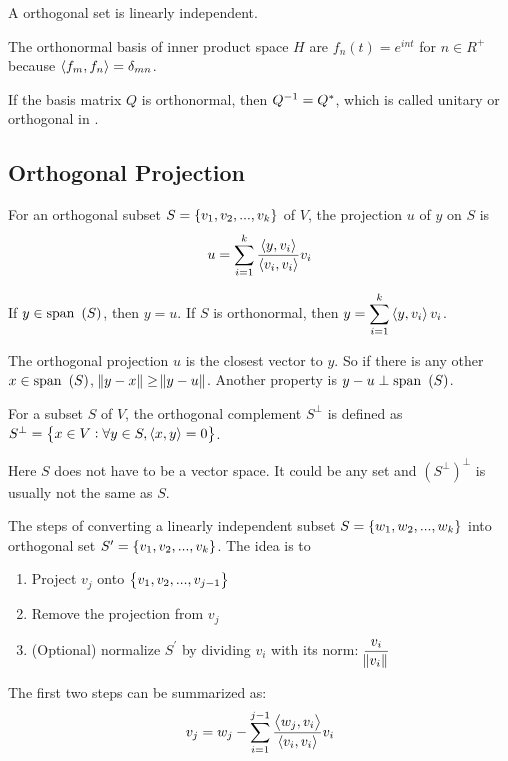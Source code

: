 A orthogonal set is linearly independent.

The orthonormal basis of inner product space $H$ are $f_n(t) = e^{int}$ for $n \in R^+$ because $\left\langle \displaystyle f_m, f_n \right\rangle = \delta_{mn} $.

If the basis matrix $Q$ is orthonormal, then ${Q}^{-1} = Q^*$, which is called unitary or orthogonal in .



\subsection{Orthogonal Projection}

For an orthogonal subset $S=\set{v_1, v_2, ..., v_k}$ of $V$, the projection $u$ of $y$ on $S$ is 
\begin{equation}
    u = \sum_{i=1}^k \frac{\left\langle \displaystyle y, v_i \right\rangle}{\left\langle \displaystyle v_i, v_i \right\rangle} v_i
\end{equation}

If $y \in \displaystyle \mathrm{span}~\left( S \right)$, then $\displaystyle y = u$. If $S$ is orthonormal, then $\displaystyle y = \sum_{i=1}^k \left\langle \displaystyle y, v_i \right\rangle v_i$. 

The orthogonal projection $u$ is the closest vector to $y$. So if there is any other $x \in \displaystyle \mathrm{span}~\left( S \right)$, $\norm{y - x} \geq \norm{y - u}$. Another property is $y - u \perp \displaystyle \mathrm{span}~\left( S \right)$.


\begin{definition}
    For a subset $S$ of $V$, the orthogonal complement $S^\perp$ is defined as $S^\perp=\set{x \in V: \forall y \in S, \left\langle \displaystyle x, y \right\rangle = 0}$.
\end{definition}

Here $S$ does not have to be a vector space. It could be any set and $(S^\perp)^\perp$ is usually not the same as $S$. 



\begin{theorem}\label{gram_schmidt_process}
    The steps of converting a linearly independent subset $S=\set{w_1, w_2, ..., w_k}$ into orthogonal set $S^\prime=\set{v_1, v_2, ..., v_k}$. The idea is to 
    \begin{enumerate}
        \item Project $v_{j}$ onto $\set{v_1, v_2, ..., v_{j-1}}$
        \item Remove the projection from $v_j$
        \item (Optional) normalize $S^\prime$ by dividing $v_i$ with its norm: $\displaystyle \frac{v_i}{\norm{v_i}}$
    \end{enumerate}
    
    The first two steps can be summarized as:
    \begin{equation}
        v_j = w_j - \sum_{i=1}^{j-1} \frac{\left\langle \displaystyle w_j, v_i \right\rangle}{\left\langle \displaystyle v_i, v_i \right\rangle} v_i
    \end{equation}
\end{theorem}

